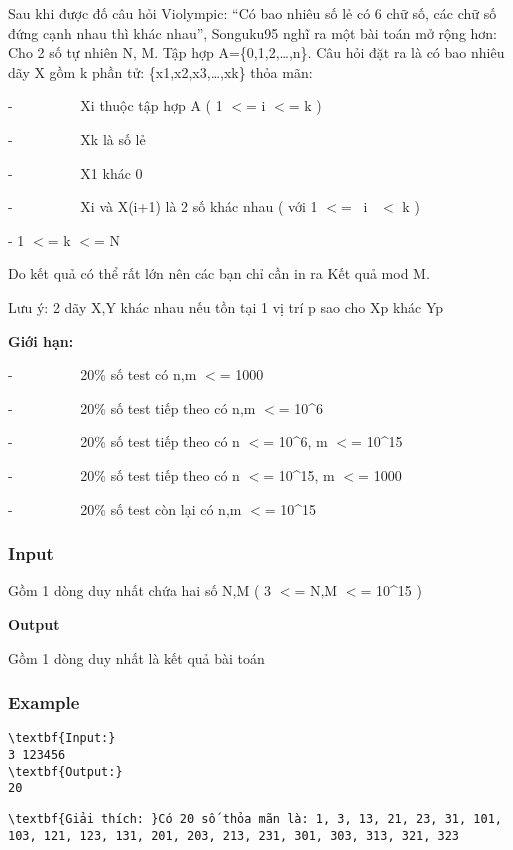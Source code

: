 



   Sau khi được đố câu hỏi Violympic: “Có bao nhiêu số lẻ có 6 chữ số, các chữ số đứng cạnh nhau thì khác nhau”, Songuku95 nghĩ ra một bài toán mở rộng hơn:   
\\   Cho 2 số tự nhiên N, M. Tập hợp A=\{0,1,2,…,n\}. Câu hỏi đặt ra là có bao nhiêu dãy X gồm k phần tử: \{x1,x2,x3,…,xk\} thỏa mãn:  

   -          Xi thuộc tập hợp A ( 1 $<$= i $<$= k )  

   -          Xk là số lẻ  

   -          X1 khác 0  

   -          Xi và X(i+1) là 2 số khác nhau ( với 1 $<$=  i  $<$ k )   

    -      1 $<$= k $<$= N  

   Do kết quả có thể rất lớn nên các bạn chỉ cần in ra Kết quả mod M.  

   Lưu ý: 2 dãy X,Y khác nhau nếu tồn tại 1 vị trí p sao cho Xp khác Yp  

\textbf{    Giới hạn:   }

   -          20\% số test có n,m $<$= 1000  

   -          20\% số test tiếp theo có n,m $<$= 10\textasciicircum6  

   -          20\% số test tiếp theo có n $<$= 10\textasciicircum6, m $<$= 10\textasciicircum15  

   -          20\% số test tiếp theo có n $<$= 10\textasciicircum15, m $<$= 1000  

   -          20\% số test còn lại có n,m $<$= 10\textasciicircum15  

\subsubsection{   Input  }

   Gồm 1 dòng duy nhất chứa hai số N,M ( 3 $<$= N,M $<$= 10\textasciicircum15 )  

\textbf{     Output    }

   Gồm 1 dòng duy nhất là kết quả bài toán  



\subsubsection{   Example  }
\begin{verbatim}
\textbf{Input:}
3 123456
\textbf{Output:}
20\end{verbatim}
\begin{verbatim}
\textbf{Giải thích: }Có 20 số thỏa mãn là: 1, 3, 13, 21, 23, 31, 101, 103, 121, 123, 131, 201, 203, 213, 231, 301, 303, 313, 321, 323\end{verbatim}